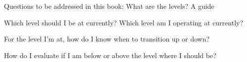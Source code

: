 Questions to be addressed in this book:
What are the levels? A guide

Which level should I be at currently?
Which level am I operating at currently?

For the level I'm at, how do I know when to transition up or down?

How do I evaluate if I am below or above the level where I should be?

